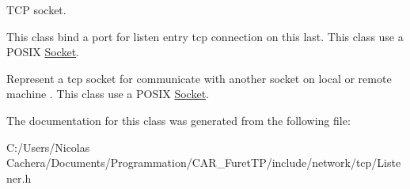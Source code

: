 T\+C\+P socket.

This class bind a port for listen entry tcp connection on this last. This class use a P\+O\+S\+I\+X \hyperlink{classFTP_1_1TCP_1_1Socket}{Socket}.

Represent a tcp socket for communicate with another socket on local or remote machine . This class use a P\+O\+S\+I\+X \hyperlink{classFTP_1_1TCP_1_1Socket}{Socket}. 

The documentation for this class was generated from the following file\+:\begin{DoxyCompactItemize}
\item 
C\+:/\+Users/\+Nicolas Cachera/\+Documents/\+Programmation/\+C\+A\+R\+\_\+\+Furet\+T\+P/include/network/tcp/Listener.\+h\end{DoxyCompactItemize}
